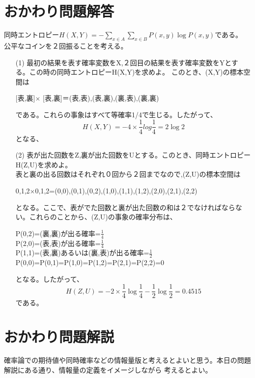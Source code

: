 \documentclass[a4j,uplatex,dvipdfmx]{jsarticle}
\begin{document}
\section*{おかわり問題解答}
同時エントロピー$\displaystyle H(X,Y)=-\sum_{x\in A} \sum_{x\in B}P(x,y)\log{P(x,y)}$である。\\
公平なコインを２回振ることを考える。
\begin{itemize}
  \item[(1)]最初の結果を表す確率変数をX,２回目の結果を表す確率変数をYとする。この時の同時エントロピーH(X,Y)を求めよ。
   このとき、(X,Y)の標本空間は
   \begin{center}
     [表,裏]$\times$ [表,裏]＝{(表,表),(表,裏),(裏,表),(裏,裏)}
   \end{center}
   である。これらの事象はすべて等確率1/4で生じる。したがって、
   \begin{equation}
     H(X,Y)=-4\times \frac{1}{4}log{\frac{1}{4}}=2\log{2}
   \end{equation}
   となる、
  \item[(2)]表が出た回数をZ,裏が出た回数をUとする。このとき、同時エントロピーH(Z,U)を求めよ。\\
  表と裏の出る回数はそれぞれ０回から２回までなので,(Z,U)の標本空間は
  \begin{center}
    {0,1,2}$\times${0,1,2}={(0,0),(0,1),(0,2),(1,0),(1,1),(1,2),(2,0),(2,1),(2,2)}
  \end{center} 
  となる。ここで、表がでた回数と裏が出た回数の和は２でなければならない。これらのことから、(Z,U)の事象の確率分布は、
  \begin{center}
    P(0,2)=(裏,裏)が出る確率=$\frac{1}{4}$\\
    P(2,0)=(表,表)が出る確率=$\frac{1}{4}$\\
    P(1,1)=(表,裏)あるいは(裏,表)が出る確率=$\frac{1}{2}$\\
    P(0,0)=P(0,1)=P(1,0)=P(1,2)=P(2,1)=P(2,2)=0
  \end{center}
  となる。したがって、
  \begin{equation}
    H(Z,U)=-2\times \frac{1}{4}\log{\frac{1}{4}}-\frac{1}{2}\log{\frac{1}{2}}=0.4515
  \end{equation}
  である。
\end{itemize}
\section*{おかわり問題解説}
確率論での期待値や同時確率などの情報量版と考えるとよいと思う。本日の問題解説にある通り、情報量の定義をイメージしながら
考えるとよい。
\end{document}
